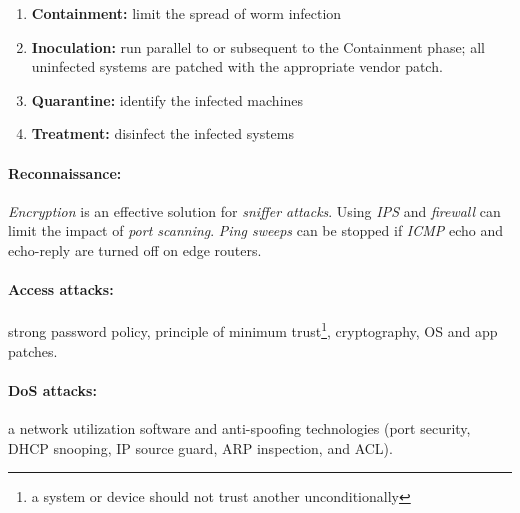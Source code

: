 \begin{enumerate}
\item \textbf{\textbf{Containment}:} limit the spread of worm infection
\item \textbf{Inoculation:} run parallel to or subsequent to the Containment phase; all uninfected systems are patched with the appropriate vendor patch.
\item \textbf{Quarantine:} identify the infected machines
\item \textbf{Treatment:} disinfect the infected systems
\end{enumerate}

\paragraph{Reconnaissance:} \emph{Encryption} is an effective solution for \textit{sniffer attacks}. Using \emph{IPS} and \emph{firewall} can limit the impact of \emph{port scanning}. \emph{Ping sweeps} can be stopped if \emph{ICMP} echo and echo-reply are turned off on edge routers. 

\paragraph{Access attacks:} strong password policy, principle of minimum trust\footnote{a system or device should not trust another unconditionally}, cryptography, OS and app patches. 

\paragraph{DoS attacks:} a network utilization software and anti-spoofing technologies (port security, DHCP snooping, IP source guard, ARP inspection, and ACL). 

%
%
%

